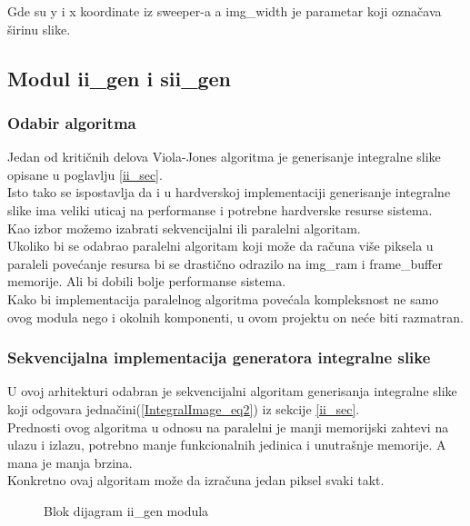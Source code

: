 Gde su y i x koordinate iz sweeper-a a img\_width je parametar koji označava
širinu slike.

\newpage

\subsection{Modul ii\_gen i sii\_gen}

\subsubsection{Odabir algoritma}\label{ii_alg_sel_sec}

Jedan od kritičnih delova Viola-Jones algoritma je generisanje integralne slike
opisane u poglavlju \ref{ii_sec}. \\
Isto tako se ispostavlja da i u hardverskoj implementaciji generisanje
integralne slike ima veliki uticaj na performanse i potrebne hardverske resurse sistema. \\

Kao izbor možemo izabrati sekvencijalni ili paralelni algoritam. \\
Ukoliko bi se odabrao paralelni algoritam koji može da računa više piksela u paraleli
povećanje resursa bi se drastično odrazilo na img\_ram i frame\_buffer memorije.
Ali bi dobili bolje performanse sistema. \\
Kako bi implementacija paralelnog algoritma povećala kompleksnost ne samo ovog
modula nego i okolnih komponenti, u ovom projektu on neće biti razmatran.

\subsubsection{Sekvencijalna implementacija generatora integralne slike}\label{ii_seq_alg_sec}

U ovoj arhitekturi odabran je sekvencijalni algoritam generisanja integralne
slike koji odgovara jednačini(\ref{IntegralImage_eq2}) iz sekcije \ref{ii_sec}.
\\
Prednosti ovog algoritma u odnosu na paralelni je manji memorijski zahtevi na
ulazu i izlazu, potrebno manje funkcionalnih jedinica i unutrašnje memorije. A
mana je manja brzina. \\
Konkretno ovaj algoritam može da izračuna jedan piksel svaki takt. \\

\begin{figure}[H]
  \centering
  \scalebox{1.0}{
    
    }
\caption{Blok dijagram ii\_gen modula}
\label{ii_gen}
\end{figure}

